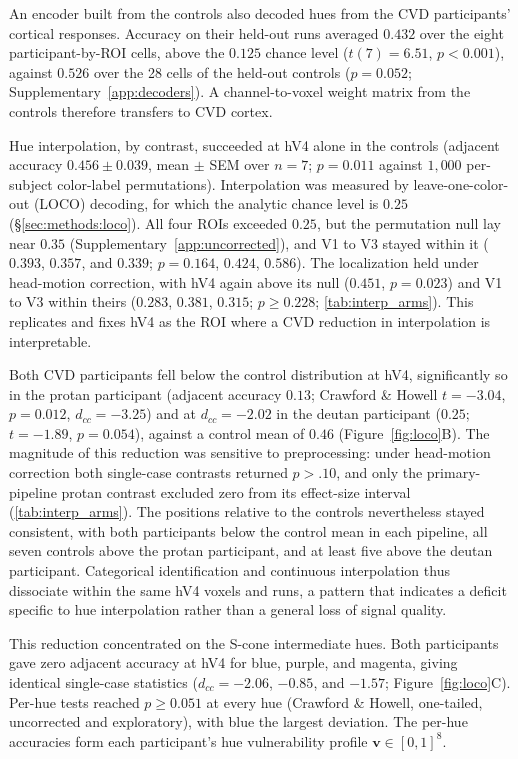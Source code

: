An encoder built from the controls also decoded hues from the CVD participants' cortical responses. Accuracy on their held-out runs averaged $0.432$ over the eight participant-by-ROI cells, above the $0.125$ chance level ($t(7) = 6.51$, $p < 0.001$), against $0.526$ over the 28 cells of the held-out controls ($p = 0.052$; Supplementary~\cref{app:decoders}). A channel-to-voxel weight matrix from the controls therefore transfers to CVD cortex. 

Hue interpolation, by contrast, succeeded at hV4 alone in the controls (adjacent accuracy $0.456 \pm 0.039$, mean $\pm$ SEM over $n = 7$; $p = 0.011$ against $1{,}000$ per-subject color-label permutations). Interpolation was measured by leave-one-color-out (LOCO) decoding, for which the analytic chance level is $0.25$ (\S\ref{sec:methods:loco}). All four ROIs exceeded $0.25$, but the permutation null lay near $0.35$ (Supplementary~\cref{app:uncorrected}), and V1 to V3 stayed within it ($0.393$, $0.357$, and $0.339$; $p = 0.164$, $0.424$, $0.586$). The localization held under head-motion correction, with hV4 again above its null ($0.451$, $p = 0.023$) and V1 to V3 within theirs ($0.283$, $0.381$, $0.315$; $p \geq 0.228$; \cref{tab:interp_arms}). This replicates \textcite{brouwer2009} and fixes hV4 as the ROI where a CVD reduction in interpolation is interpretable.

Both CVD participants fell below the control distribution at hV4, significantly so in the protan participant (adjacent accuracy $0.13$; Crawford \& Howell $t = -3.04$, $p = 0.012$, $d_{cc} = -3.25$) and at $d_{cc} = -2.02$ in the deutan participant ($0.25$; $t = -1.89$, $p = 0.054$), against a control mean of $0.46$ (Figure~\ref{fig:loco}B). The magnitude of this reduction was sensitive to preprocessing: under head-motion correction both single-case contrasts returned $p > .10$, and only the primary-pipeline protan contrast excluded zero from its effect-size interval (\cref{tab:interp_arms}). The positions relative to the controls nevertheless stayed consistent, with both participants below the control mean in each pipeline, all seven controls above the protan participant, and at least five above the deutan participant. Categorical identification and continuous interpolation thus dissociate within the same hV4 voxels and runs, a pattern that indicates a deficit specific to hue interpolation rather than a general loss of signal quality.

This reduction concentrated on the S-cone intermediate hues. Both participants gave zero adjacent accuracy at hV4 for blue, purple, and magenta, giving identical single-case statistics ($d_{cc} = -2.06$, $-0.85$, and $-1.57$; Figure~\ref{fig:loco}C). Per-hue tests reached $p \geq 0.051$ at every hue (Crawford \& Howell, one-tailed, uncorrected and exploratory), with blue the largest deviation. The per-hue accuracies form each participant's hue vulnerability profile $\mathbf{v} \in [0,1]^8$.

